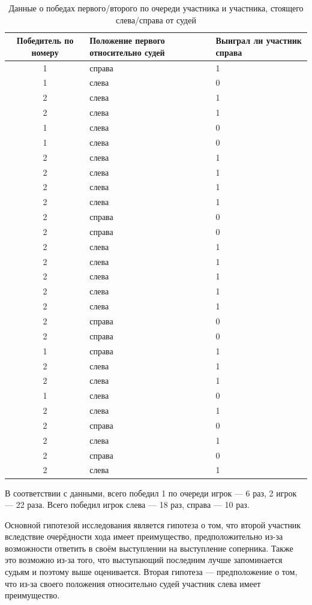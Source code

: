 \documentclass[a4paper]{article}
\theoremstyle{plain} %
\theoremstyle{definition}
\theoremstyle{remark}
\begin{document}
\newpage
\begin{center}
\begin{table}
\begin{tabular}{|c|p{4cm}|p{3cm}|}
\hline
Победитель по номеру	&Положение первого относительно судей&Выиграл ли участник справа\\
\hline
1&	справа&1\\
1&	слева&0\\
2&	слева&1\\
2&	слева&1\\
1&	слева&0\\
1&	слева&0\\
2&	слева&1\\
2&	слева&1\\
2&	слева&1\\
2&	слева&1\\
2&	справа&0\\
2&	справа&0\\
2&	слева&1\\
2&	слева&1\\
2&	слева&1\\
2&	слева&1\\
2&	слева&1\\
2&	справа&0\\
2&	справа&0\\
1&	справа&1\\
2&	слева&1\\
2&	слева&1\\
1&	слева&0\\
2&	слева&1\\
2&	справа&0\\
2&	слева&1\\
2&	справа&0\\
2&	слева&1\\
\hline

\end{tabular}
\caption{Данные о победах первого/второго по очереди участника и участника, стоящего слева/справа от судей}
\end{table}
\end{center}

В соответствии с данными, всего победил 1 по очереди игрок --- 6 раз, 2 игрок --- 22 раза. Всего победил игрок слева --- 18 раз, справа --- 10 раз. 




Основной гипотезой исследования является гипотеза о том, что второй участник вследствие очерёдности хода имеет преимущество, предположительно из-за возможности ответить в своём выступлении на выступление соперника. Также это возможно из-за того, что выступающий последним лучше запоминается судьям и поэтому выше оценивается. Вторая гипотеза --- предположение о том, что из-за своего положения относительно судей участник слева имеет преимущество.
\end{document}
